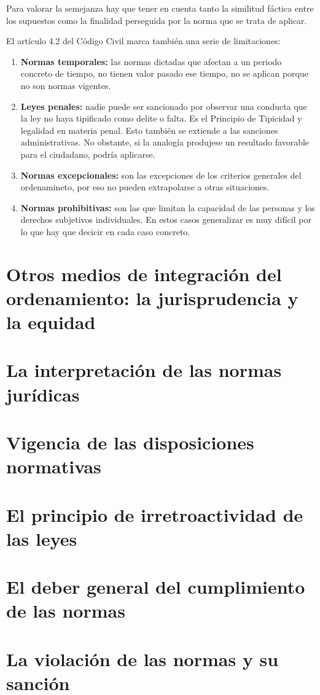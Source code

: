 \documentclass[a4paper,12pt]{report}
\begin{document}
Para valorar la semejanza hay que tener en cuenta tanto la similitud fáctica entre los supuestos como la finalidad perseguida por la norma que se trata de aplicar.

El artículo 4.2 del Código Civil marca también una serie de limitaciones:

\begin{enumerate}
\item \textbf{Normas temporales:} las normas dictadas que afectan a un periodo concreto de tiempo, no tienen valor pasado ese tiempo, no se aplican porque no son normas vigentes.
\item \textbf{Leyes penales:} nadie puede ser sancionado por observar una conducta que la ley no haya tipificado como delite o falta. Es el Principio de Tipicidad y legalidad en materia penal. Esto también se extiende a las sanciones administrativas. No obstante, si la analogía produjese un resultado favorable para el ciudadano, podría aplicarse.
\item \textbf{Normas excepcionales:} son las excepciones de los criterios generales del ordenamineto, por eso no pueden extrapolarse a otras situaciones.
\item \textbf{Normas prohibitivas:} son las que limitan la capacidad de las personas y los derechos subjetivos individuales. En estos casos generalizar es muy difícil por lo que hay que decicir en cada caso concreto.
\end{enumerate}

\section{Otros medios de integración del ordenamiento: la jurisprudencia y la equidad}
\section{La interpretación de las normas jurídicas}
\section{Vigencia de las disposiciones normativas}
\section{El principio de irretroactividad de las leyes}
\section{El deber general del cumplimiento de las normas}
\section{La violación de las normas y su sanción}
\end{document}
